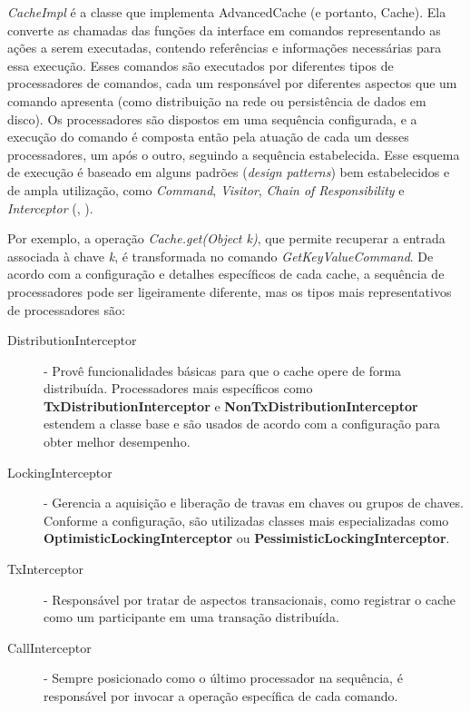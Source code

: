 \documentclass[11pt,twoside,a4paper]{book}
\begin{document}
\emph{CacheImpl} é a classe que implementa AdvancedCache (e portanto, Cache). Ela converte as chamadas das funções da interface em comandos representando as ações a serem executadas, contendo referências e informações necessárias para essa execução. Esses comandos são executados por diferentes tipos de processadores de comandos, cada um responsável por diferentes aspectos que um comando apresenta (como distribuição na rede ou persistência de dados em disco). Os processadores são dispostos em uma sequência configurada, e a execução do comando é composta então pela atuação de cada um desses processadores, um após o outro, seguindo a sequência estabelecida. Esse esquema de execução é baseado em alguns padrões (\emph{design patterns}) bem estabelecidos e de ampla utilização, como \emph{Command}, \emph{Visitor}, \emph{Chain of Responsibility} e \emph{Interceptor} (\cite{design_patterns}, \cite{posa}).

Por exemplo, a operação \emph{Cache.get(Object k)}, que permite recuperar a entrada associada à chave \emph{k}, é transformada no comando \emph{GetKeyValueCommand}. De acordo com a configuração e detalhes específicos de cada cache, a sequência de processadores pode ser ligeiramente diferente, mas os tipos mais representativos de processadores são:

\begin{description} 
	\item[DistributionInterceptor] - Provê funcionalidades básicas para que o cache opere de forma distribuída. Processadores mais específicos como \textbf{TxDistributionInterceptor} e \textbf{NonTxDistributionInterceptor} estendem a classe base e são usados de acordo com a configuração para obter melhor desempenho.
	\item[LockingInterceptor] - Gerencia a aquisição e liberação de travas em chaves ou grupos de chaves. Conforme a configuração, são utilizadas classes mais especializadas como \textbf{OptimisticLockingInterceptor} ou \textbf{PessimisticLockingInterceptor}.
	\item[TxInterceptor] - Responsável por tratar de aspectos transacionais, como registrar o cache como um participante em uma transação distribuída.
	\item[CallInterceptor] - Sempre posicionado como o último processador na sequência, é responsável por invocar a operação específica de cada comando.
\end{description}
\end{document}
